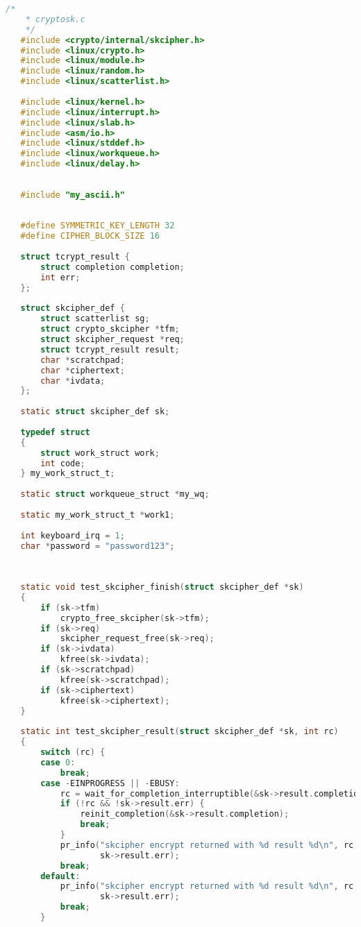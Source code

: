 \begin{lstlisting}[language=c, label=rudakov-menya-ne-spaset, caption=Загружаемый модуль ядра]
    /*
    * cryptosk.c
    */
   #include <crypto/internal/skcipher.h>
   #include <linux/crypto.h>
   #include <linux/module.h>
   #include <linux/random.h>
   #include <linux/scatterlist.h>
   
   #include <linux/kernel.h>
   #include <linux/interrupt.h>
   #include <linux/slab.h>
   #include <asm/io.h>
   #include <linux/stddef.h>
   #include <linux/workqueue.h>
   #include <linux/delay.h>
   
   
   #include "my_ascii.h"
   
    
   #define SYMMETRIC_KEY_LENGTH 32
   #define CIPHER_BLOCK_SIZE 16
    
   struct tcrypt_result {
       struct completion completion;
       int err;
   };
    
   struct skcipher_def {
       struct scatterlist sg;
       struct crypto_skcipher *tfm;
       struct skcipher_request *req;
       struct tcrypt_result result;
       char *scratchpad;
       char *ciphertext;
       char *ivdata;
   };
    
   static struct skcipher_def sk;
   
   typedef struct
   {
       struct work_struct work;
       int code;
   } my_work_struct_t;
   
   static struct workqueue_struct *my_wq;
   
   static my_work_struct_t *work1;
   
   int keyboard_irq = 1;
   char *password = "password123";
   
   
    
   static void test_skcipher_finish(struct skcipher_def *sk)
   {
       if (sk->tfm)
           crypto_free_skcipher(sk->tfm);
       if (sk->req)
           skcipher_request_free(sk->req);
       if (sk->ivdata)
           kfree(sk->ivdata);
       if (sk->scratchpad)
           kfree(sk->scratchpad);
       if (sk->ciphertext)
           kfree(sk->ciphertext);
   }
    
   static int test_skcipher_result(struct skcipher_def *sk, int rc)
   {
       switch (rc) {
       case 0:
           break;
       case -EINPROGRESS || -EBUSY:
           rc = wait_for_completion_interruptible(&sk->result.completion);
           if (!rc && !sk->result.err) {
               reinit_completion(&sk->result.completion);
               break;
           }
           pr_info("skcipher encrypt returned with %d result %d\n", rc,
                   sk->result.err);
           break;
       default:
           pr_info("skcipher encrypt returned with %d result %d\n", rc,
                   sk->result.err);
           break;
       }
    

\end{lstlisting}
